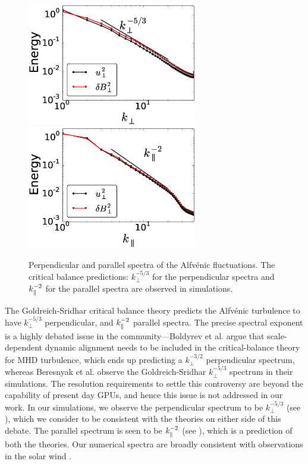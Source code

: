 \begin{figure}
\begin{center}
    \includegraphics[width=7.4cm]{figs/slowmodes/sw1_alf_kpspec.eps}
    \includegraphics[width=7.4cm]{figs/slowmodes/sw1_alf_kparspec.eps}
    \caption{Perpendicular and parallel spectra of the Alfv\'{e}nic fluctuations. The
    critical balance predictions: $k_\perp^{-5/3}$ for the perpendicular spectra and
    $k_\parallel^{-2}$ for the parallel spectra are observed in simulations.}
\label{slowmodes:fig:alfspec} 
\end{center}
\end{figure}

    The Goldreich-Sridhar critical balance theory \cite{goldreich95, goldreich97, tome} predicts the Alfv\'{e}nic turbulence to
    have $k_\perp^{-5/3}$ perpendicular, and $k_\parallel^{-2}$ parallel spectra. The
    precise spectral exponent is a highly debated issue in the community---Boldyrev
    et al.\cite{boldyrev05, boldyrev06, boldyrev09, boldyrev11} argue that 
    scale-dependent dynamic alignment needs to be included in the critical-balance theory
    for MHD turbulence, which ends up predicting a $k_\perp^{-3/2}$ perpendicular
    spectrum, whereas Beresnyak et al. \cite{beresnyak11, beresnyak11prl} observe the
    Goldreich-Sridhar $k_\perp^{-5/3}$ spectrum in their simulations. The resolution requirements to settle this controversy are
    beyond the capability of present day GPUs, and hence this issue is not addressed in
    our work. In our simulations, we observe the perpendicular spectrum to be $k_\perp^{-5/3}$ (see
    ), which we consider to be consistent with the
    theories on either side of this debate.
    The parallel spectrum is seen to be $k_\parallel^{-2}$ (see
    ), which is a
    prediction of both the theories. Our numerical spectra
    are broadly consistent with observations in the solar wind \cite{matthaeus82, bale05,
    podesta07, tessein09, podesta10, chen10, chen11}.

